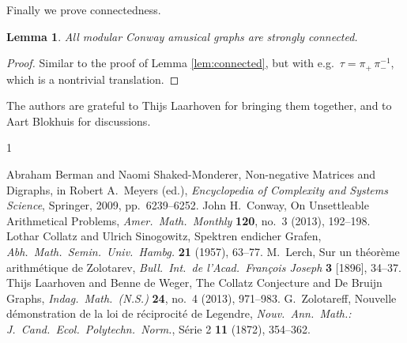 \documentclass[10pt]{article}
\newtheorem{lemma}{Lemma}
\theoremstyle{definition}
\begin{document}
Finally we prove connectedness.

\begin{lemma} \label{lem:connectedconway}
    All modular Conway amusical graphs are strongly connected.
\end{lemma}

\begin{proof}
    Similar to the proof of Lemma \ref{lem:connected}, but with e.g.\ $ \tau = \pi_+ \, \pi_-^{-1} $, which
    is a nontrivial translation.
\end{proof}


\vskip20pt The authors are grateful to Thijs Laarhoven for bringing them
together, and to Aart Blokhuis for discussions.


\begin{thebibliography}{1}\footnotesize

 Abraham Berman and Naomi Shaked-Monderer, Non-negative Matrices and
Digraphs, in Robert A.\ Meyers (ed.), \emph{Encyclopedia of Complexity and Systems Science}, Springer,
2009, pp.\ 6239--6252.
 John H.\ Conway, On Unsettleable Arithmetical Problems, \emph{Amer.\
Math.\ Monthly} \textbf{120}, no.\ 3 (2013), 192--198.
 Lothar Collatz and Ulrich Sinogowitz, Spektren endicher Grafen,
\emph{Abh.\ Math.\ Semin.\ Univ.\ Hambg.} \textbf{21} (1957), 63--77.
\bibitem{L} M.\ Lerch, Sur un th\'eor\`eme arithm\'etique de Zolotarev, \emph{Bull.\ Int.\
de l'Acad.\ Fran\c{c}ois Joseph} \textbf{3} [1896], 34--37.
\bibitem{LdW} Thijs Laarhoven and Benne de Weger, The Collatz Conjecture and De Bruijn
Graphs, \emph{Indag.\ Math.\ (N.S.)} \textbf{24}, no.\ 4 (2013), 971--983.
\bibitem{Z} G.\ Zolotareff, Nouvelle d\'emonstration de la loi de r\'eciprocit\'e de
Legendre, \emph{Nouv.\ Ann.\ Math.: J.\ Cand.\ Ecol.\ Polytechn.\ Norm.}, S\'erie 2 \textbf{11} (1872), 354--362.

\end{thebibliography}
\end{document}
